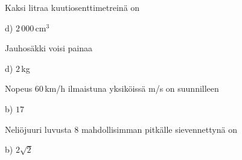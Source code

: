 \begin{multicols}{2}
\begin{tehtava}
Kaksi litraa kuutiosenttimetreinä on	
	\begin{vastaus}
	d) $2\,000$\,cm$^3$
	\end{vastaus}
\end{tehtava}

\begin{tehtava}
Jauhosäkki voisi painaa
	\begin{vastaus}
	d) $2$\,kg
	\end{vastaus}
\end{tehtava}

\begin{tehtava}
Nopeus $60$\,km/h ilmaistuna yksiköissä m/s on suunnilleen
	\begin{vastaus}
	b) $17$
	\end{vastaus}
\end{tehtava}

\begin{tehtava}
Neliöjuuri luvusta $8$ mahdollisimman pitkälle sievennettynä on
  \begin{vastaus}
	 b) $2\sqrt{2}$
    \end{vastaus}
\end{tehtava}
\end{multicols}

